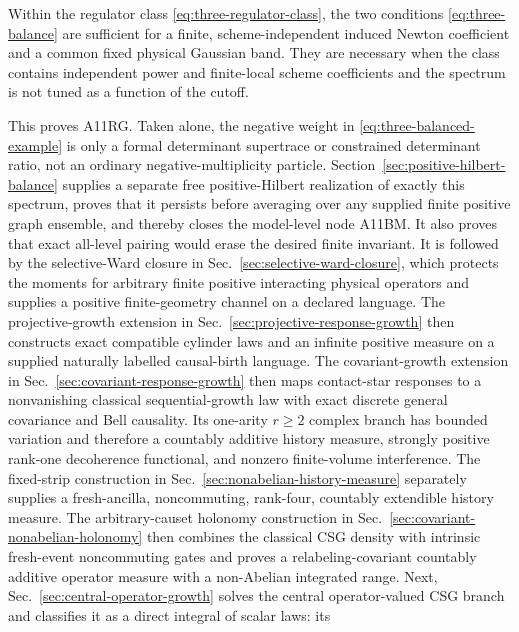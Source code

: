 \begin{theorem}
\label{thm:three-newton-universality}
Within the regulator class \eqref{eq:three-regulator-class}, the two
conditions \eqref{eq:three-balance} are sufficient for a finite,
scheme-independent induced Newton coefficient and a common fixed physical
Gaussian band.  They are necessary when the class contains independent
power and finite-local scheme coefficients and the spectrum is not tuned as
a function of the cutoff.
\end{theorem}

This proves A11RG.  Taken alone, the negative weight in
\eqref{eq:three-balanced-example} is only a formal determinant supertrace
or constrained determinant ratio, not an ordinary negative-multiplicity
particle.  Section~\ref{sec:positive-hilbert-balance} supplies a separate
free positive-Hilbert realization of exactly this spectrum, proves that it
persists before averaging over any supplied finite positive graph
ensemble, and thereby closes the model-level node A11BM.  It also proves
that exact all-level pairing would erase the desired finite invariant.  It
is followed by the selective-Ward closure in
Sec.~\ref{sec:selective-ward-closure}, which protects the moments for
arbitrary finite positive interacting physical operators and supplies a
positive finite-geometry channel on a declared language.  The
projective-growth extension in
Sec.~\ref{sec:projective-response-growth} then constructs exact compatible
cylinder laws and an infinite positive measure on a supplied naturally
labelled causal-birth language.  The covariant-growth extension in
Sec.~\ref{sec:covariant-response-growth} then maps contact-star responses to
a nonvanishing classical sequential-growth law with exact discrete general
covariance and Bell causality.  Its one-arity \(r\ge2\) complex branch has
bounded variation and therefore a countably additive history measure,
strongly positive rank-one decoherence functional, and nonzero
finite-volume interference.  The fixed-strip construction in
Sec.~\ref{sec:nonabelian-history-measure} separately supplies a
fresh-ancilla, noncommuting, rank-four, countably extendible history
measure.  The arbitrary-causet holonomy construction in
Sec.~\ref{sec:covariant-nonabelian-holonomy} then combines the classical CSG
density with intrinsic fresh-event noncommuting gates and proves a
relabeling-covariant countably additive operator measure with a
non-Abelian integrated range.  Next,
Sec.~\ref{sec:central-operator-growth} solves the central operator-valued
CSG branch and classifies it as a direct integral of scalar laws: its
